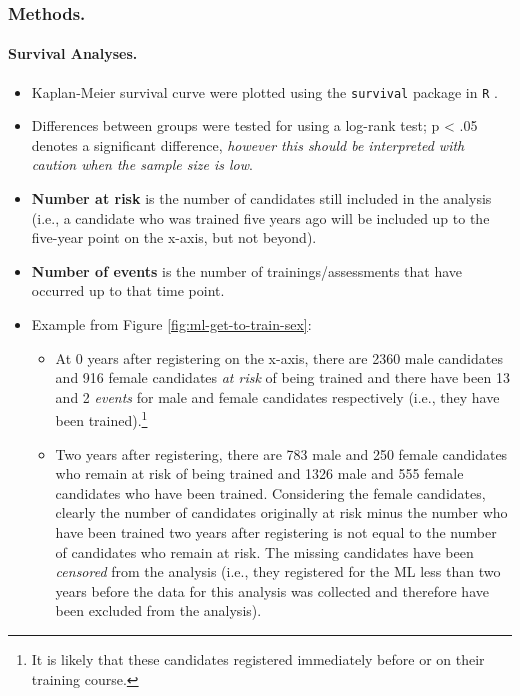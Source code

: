 \documentclass[
  12pt,
  a4paper,
]{book}
\providecommand{\tightlist}{%
  \setlength{\itemsep}{0pt}\setlength{\parskip}{0pt}}
\begin{document}
\hypertarget{mts-part-a-methods}{%
\subsubsection{Methods.}\label{mts-part-a-methods}}

\hypertarget{mts-part-a-survival-analyses}{%
\paragraph{Survival Analyses.}\label{mts-part-a-survival-analyses}}

\begin{itemize}
\tightlist
\item
  Kaplan-Meier survival curve were plotted using the \texttt{survival} package in \texttt{R} \citep{HarrellJr2015, R-survival, R-base}.
\item
  Differences between groups were tested for using a log-rank test; p \textless{} .05 denotes a significant difference, \emph{however this should be interpreted with caution when the sample size is low}.
\item
  \textbf{Number at risk} is the number of candidates still included in the analysis (i.e., a candidate who was trained five years ago will be included up to the five-year point on the x-axis, but not beyond).
\item
  \textbf{Number of events} is the number of trainings/assessments that have occurred up to that time point.
\item
  Example from Figure \ref{fig:ml-get-to-train-sex}:

  \begin{itemize}
  \tightlist
  \item
    At 0 years after registering on the x-axis, there are 2360 male candidates and 916 female candidates \emph{at risk} of being trained and there have been 13 and 2 \emph{events} for male and female candidates respectively (i.e., they have been trained).\footnote{It is likely that these candidates registered immediately before or on their training course.}
  \item
    Two years after registering, there are 783 male and 250 female candidates who remain at risk of being trained and 1326 male and 555 female candidates who have been trained. Considering the female candidates, clearly the number of candidates originally at risk minus the number who have been trained two years after registering is not equal to the number of candidates who remain at risk. The missing candidates have been \emph{censored} from the analysis (i.e., they registered for the ML less than two years before the data for this analysis was collected and therefore have been excluded from the analysis).
  \end{itemize}
\end{itemize}
\end{document}
